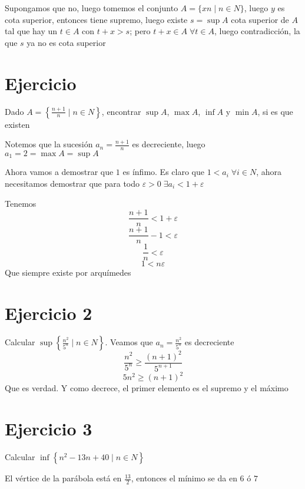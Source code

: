 \documentclass{article}
\begin{document}
Supongamos que no, luego tomemos el conjunto $A = \{xn \mid n \in N\}$, luego $y$ es cota
superior, entonces tiene supremo, luego existe $s = \sup A$ cota superior de $A$
tal que hay un $t \in A$
con $t + x > s$; pero $t + x \in A \;\forall t \in A$, luego contradicción, la que $s$
ya no es cota superior

\section{Ejercicio}
Dado $A = \left\{\frac{n+1}{n} \mid n \in N \right\}$, encontrar $\sup A$, $\max A$, $\inf A$ y $\min A$, si es que existen

Notemos que la sucesión $a_n = \frac{n+1}{n}$ es decreciente, luego $a_1 = 2 = \max A = \sup A$

Ahora vamos a demostrar que $1$ es ínfimo. Es claro que $1 < a_i \; \forall i \in N$, ahora necesitamos demostrar que para todo $\varepsilon > 0 \; \exists a_i < 1 + \varepsilon$

Tenemos
\[\frac{n+1}{n} < 1 + \varepsilon\]
\[\frac{n+1}{n} - 1 < \varepsilon\]
\[\frac{1}{n} < \varepsilon\]
\[1 < n\varepsilon\]
Que siempre existe por arquímedes

\section{Ejercicio 2}
Calcular $\sup \left\{\frac{n^2}{5^n} \mid n \in N\right\}$.
Veamos que $a_n = \frac{n^2}{5^n}$ es decreciente
\[\frac{n^2}{5^n} \ge \frac{(n+1)^2}{5^{n+1}}\]
\[5n^2 \ge (n+1)^2\]
Que es verdad. Y como decrece, el primer elemento es el supremo y el máximo

\section{Ejercicio 3}
Calcular $\inf \left\{n^2 - 13n + 40 \mid n \in N\right\}$

El vértice de la parábola está en $\frac{13}{2}$, entonces el mínimo se da en $6$ ó $7$
\end{document}
